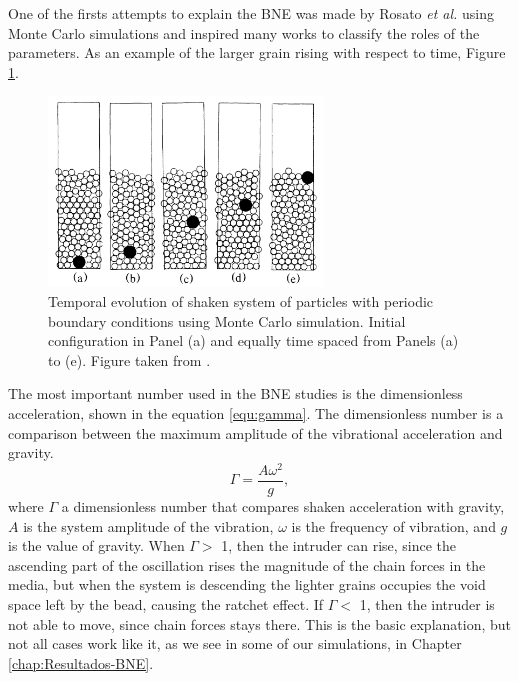     One of the firsts attempts to explain the BNE was made by Rosato \textit{et al.} \cite{Why_the_Brazil_nuts_are_on_top} using Monte Carlo simulations and inspired many works to classify the roles of the parameters. As an example of the larger grain rising with respect to time, Figure \ref{fig:BNE_rosato}.

\begin{figure}
    \centering
    \includegraphics[width=0.65\textwidth]{04-figuras/BNE_Rosato.png}
    \caption[BNE cycles.]{Temporal evolution of shaken system of particles with periodic boundary conditions using Monte Carlo simulation. Initial configuration in Panel (a) and equally time spaced from Panels (a) to (e). Figure taken from \cite{Why_the_Brazil_nuts_are_on_top}.}
    \label{fig:BNE_rosato}
\end{figure}

    The most important number used in the BNE studies is the dimensionless acceleration, shown in the equation \ref{equ:gamma}. The dimensionless number is a comparison between the maximum amplitude of the vibrational acceleration and gravity. 
\begin{equation}
    \label{equ:gamma}
    \Gamma = \frac{A\omega^{2}}{g},
\end{equation}
where $\Gamma$ a dimensionless number that compares shaken acceleration with gravity, $A$ is the system amplitude of the vibration, $\omega$ is the frequency of vibration, and $g$ is the value of gravity. When $\Gamma > $ 1, then the intruder can rise, since the ascending part of the oscillation rises the magnitude of the chain forces in the media, but when the system is descending the lighter grains occupies the void space left by the bead, causing the ratchet effect. If $\Gamma < $ 1, then the intruder is not able to move, since chain forces stays there. This is the basic explanation, but not all cases work like it, as we see in some of our simulations, in Chapter \ref{chap:Resultados-BNE}.


